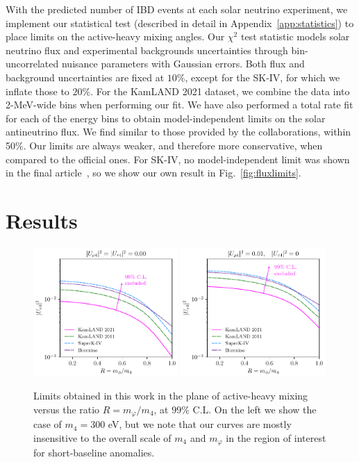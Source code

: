 \documentclass[
reprint,
superscriptaddress,
showpacs,
preprintnumbers,
nofootinbib,
nobibnotes,
amsmath,
amssymb, 
aps,
prd,
floatfix
]{revtex4-1}
\newcommand{\reffig}[1]{Fig.~\ref{#1}}
\newcommand{\refapp}[1]{Appendix~\ref{#1}}
\renewcommand{\phi}{\varphi}
\begin{document}
With the predicted number of IBD events at each solar neutrino experiment, we implement our statistical test (described in detail in \refapp{app:statistics}) to place limits on the active-heavy mixing angles. Our $\chi^2$ test statistic models solar neutrino flux and experimental backgrounds uncertainties through bin-uncorrelated nuisance parameters with Gaussian errors. Both flux and background uncertainties are fixed at $10\%$, except for the SK-IV, for which we inflate those to $20\%$. For the KamLAND 2021 dataset, we combine the data into 2-MeV-wide bins when performing our fit. We have also performed a total rate fit for each of the energy bins to obtain model-independent limits on the solar antineutrino flux. We find similar to those provided by the collaborations, within 50\%. Our limits are always weaker, and therefore more conservative, when compared to the official ones. For SK-IV, no model-independent limit was shown in the final article~\cite{Super-Kamiokande:2020frs}, so we show our own result in \reffig{fig:fluxlimits}.


\section{Results}\label{sec:results}

\begin{figure}[t]
    \centering
    \includegraphics[width=0.49\textwidth]{limits_ratio_0.pdf}
    \includegraphics[width=0.49\textwidth]{limits_ratio_01.pdf}
\caption{\label{fig:limits_ratio} Limits obtained in this work in the plane of active-heavy mixing versus the ratio $R = m_\phi/m_4$, at $99\%$ C.L. On the left we show the case of $m_4 = 300$ eV, but we note that our curves are mostly insensitive to the overall scale of $m_4$ and $m_\phi$ in the region of interest for short-baseline anomalies.}
\end{figure}
\end{document}
